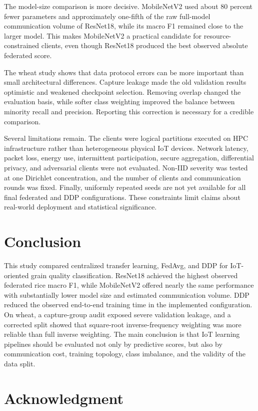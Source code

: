 \documentclass[conference]{IEEEtran}
\begin{document}
The model-size comparison is more decisive. MobileNetV2 used about 80 percent fewer parameters and approximately one-fifth of the raw full-model communication volume of ResNet18, while its macro F1 remained close to the larger model. This makes MobileNetV2 a practical candidate for resource-constrained clients, even though ResNet18 produced the best observed absolute federated score.

The wheat study shows that data protocol errors can be more important than small architectural differences. Capture leakage made the old validation results optimistic and weakened checkpoint selection. Removing overlap changed the evaluation basis, while softer class weighting improved the balance between minority recall and precision. Reporting this correction is necessary for a credible comparison.

Several limitations remain. The clients were logical partitions executed on HPC infrastructure rather than heterogeneous physical IoT devices. Network latency, packet loss, energy use, intermittent participation, secure aggregation, differential privacy, and adversarial clients were not evaluated. Non-IID severity was tested at one Dirichlet concentration, and the number of clients and communication rounds was fixed. Finally, uniformly repeated seeds are not yet available for all final federated and DDP configurations. These constraints limit claims about real-world deployment and statistical significance.

\section{Conclusion}

This study compared centralized transfer learning, FedAvg, and DDP for IoT-oriented grain quality classification. ResNet18 achieved the highest observed federated rice macro F1, while MobileNetV2 offered nearly the same performance with substantially lower model size and estimated communication volume. DDP reduced the observed end-to-end training time in the implemented configuration. On wheat, a capture-group audit exposed severe validation leakage, and a corrected split showed that square-root inverse-frequency weighting was more reliable than full inverse weighting. The main conclusion is that IoT learning pipelines should be evaluated not only by predictive scores, but also by communication cost, training topology, class imbalance, and the validity of the data split.

\section*{Acknowledgment}
\end{document}

